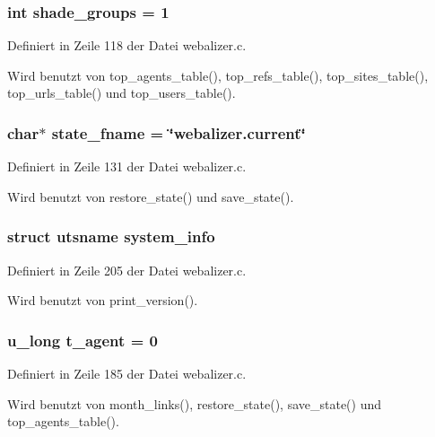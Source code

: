 \subsubsection{\setlength{\rightskip}{0pt plus 5cm}int {\bf shade\_\-groups} = 1}\label{webalizer_8c_9b469898b01940a383f1ed816e4459b2}




Definiert in Zeile 118 der Datei webalizer.c.

Wird benutzt von top\_\-agents\_\-table(), top\_\-refs\_\-table(), top\_\-sites\_\-table(), top\_\-urls\_\-table() und top\_\-users\_\-table().
\subsubsection{\setlength{\rightskip}{0pt plus 5cm}char$\ast$ {\bf state\_\-fname} = \char`\"{}webalizer.current\char`\"{}}\label{webalizer_8c_bc6083147b471a6df297cc5851057771}




Definiert in Zeile 131 der Datei webalizer.c.

Wird benutzt von restore\_\-state() und save\_\-state().
\subsubsection{\setlength{\rightskip}{0pt plus 5cm}struct utsname {\bf system\_\-info}}\label{webalizer_8c_fb4af3ebf8357e94b736496594995cee}




Definiert in Zeile 205 der Datei webalizer.c.

Wird benutzt von print\_\-version().
\subsubsection{\setlength{\rightskip}{0pt plus 5cm}u\_\-long {\bf t\_\-agent} = 0}\label{webalizer_8c_681645a12ff433a6d191ac4eabbb265d}




Definiert in Zeile 185 der Datei webalizer.c.

Wird benutzt von month\_\-links(), restore\_\-state(), save\_\-state() und top\_\-agents\_\-table().
